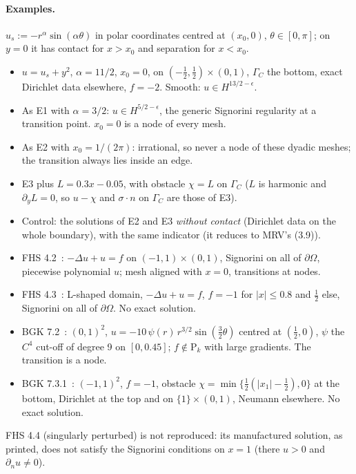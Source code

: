 \documentclass[11pt,a4paper]{article}
\theoremstyle{definition}
\newcommand{\Pk}[1]{\mathrm{P}_{#1}}
\begin{document}
\paragraph{Examples.} $u_s:=-r^{\alpha}\sin(\alpha\theta)$ in polar coordinates centred at
$(x_0,0)$, $\theta\in[0,\pi]$; on $y=0$ it has contact for $x>x_0$ and separation for $x<x_0$.
\begin{itemize}
  \item[E1] $u=u_s+y^2$, $\alpha=11/2$, $x_0=0$, on $(-\frac12,\frac12)\times(0,1)$, $\Gamma_C$ the bottom,
        exact Dirichlet data elsewhere, $f=-2$. Smooth: $u\in H^{13/2-\epsilon}$.
  \item[E2] As E1 with $\alpha=3/2$: $u\in H^{5/2-\epsilon}$, the generic Signorini regularity at a
        transition point. $x_0=0$ is a node of every mesh.
  \item[E3] As E2 with $x_0=1/(2\pi)$: irrational, so never a node of these dyadic meshes; the
        transition always lies inside an edge.
  \item[E4] E3 plus $L=0.3x-0.05$, with obstacle $\chi=L$ on $\Gamma_C$ ($L$ is harmonic and
        $\partial_yL=0$, so $u-\chi$ and $\sigma\cdot n$ on $\Gamma_C$ are those of E3).
  \item[E5] Control: the solutions of E2 and E3 \emph{without contact} (Dirichlet data on the whole
        boundary), with the same indicator (it reduces to MRV's (3.9)).
  \item[E6] FHS 4.2~\cite{fhs}: $-\Delta u+u=f$ on $(-1,1)\times(0,1)$, Signorini on all of
        $\partial\Omega$, piecewise polynomial $u$; mesh aligned with $x=0$, transitions at nodes.
  \item[E7] FHS 4.3~\cite{fhs}: L-shaped domain, $-\Delta u+u=f$, $f=-1$ for $|x|\le0.8$ and $\frac12$
        else, Signorini on all of $\partial\Omega$. No exact solution.
  \item[E8] BGK 7.2~\cite{bgk}: $(0,1)^2$, $u=-10\,\psi(r)\,r^{3/2}\sin(\frac32\theta)$ centred at
        $(\frac12,0)$, $\psi$ the $C^4$ cut-off of degree 9 on $[0,0.45]$; $f\notin\Pk{k}$ with large
        gradients. The transition is a node.
  \item[E9] BGK 7.3.1~\cite{bgk}: $(-1,1)^2$, $f=-1$, obstacle $\chi=\min\{\frac12(|x_1|-\frac12),0\}$
        at the bottom, Dirichlet at the top and on $\{1\}\times(0,1)$, Neumann elsewhere. No exact
        solution.
\end{itemize}
FHS 4.4 (singularly perturbed) is not reproduced: its manufactured solution, as printed, does not
satisfy the Signorini conditions on $x=1$ (there $u>0$ and $\partial_nu\ne0$).
\end{document}

